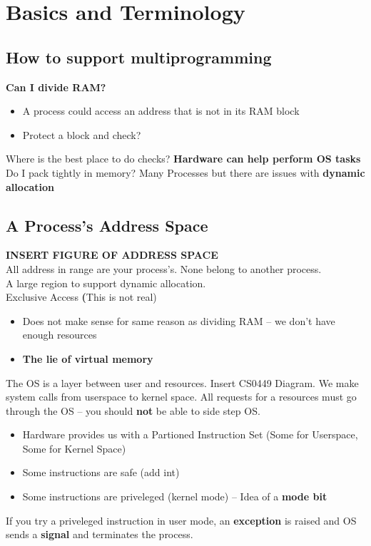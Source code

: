 \documentclass[../base_file/cs1550_notes.tex]{subfiles}
\begin{document}
\chapter{Basics and Terminology}
\section{How to support multiprogramming}
\textbf{Can I divide RAM?}
	\begin{itemize}
	\item A process could access an address that is not in its RAM block
	\item Protect a block and check?
	\end{itemize}
Where is the best place to do checks?  \textbf{Hardware can help perform OS tasks}
Do I pack tightly in memory?  Many Processes but there are issues with \textbf{dynamic allocation}

\section{A Process's Address Space}
\textbf{INSERT FIGURE OF ADDRESS SPACE}\\
All address in range are your process's. None belong to another process.\\
A large region to support dynamic allocation.\\
Exclusive Access \textbf(This is not real)
	\begin{itemize}
	\item Does not make sense for same reason as dividing RAM -- we don't have enough resources
   	\item \textbf{The lie of virtual memory}
	\end{itemize}	
The OS is a layer between user and resources.  Insert CS0449 Diagram.  We make system calls from userspace
to kernel space.  All requests for a resources must go through the OS -- you should \textbf{not} be able
to side step OS.
	\begin{itemize}
	\item Hardware provides us with a Partioned Instruction Set (Some for Userspace, Some for Kernel Space)
	\item Some instructions are safe (add int)
	\item Some instructions are priveleged (kernel mode) -- Idea of a \textbf{mode bit}
	\end{itemize}
If you try a priveleged instruction in user mode, an \textbf{exception} is raised and OS sends a
\textbf{signal} and terminates the process.\\
\end{document}
